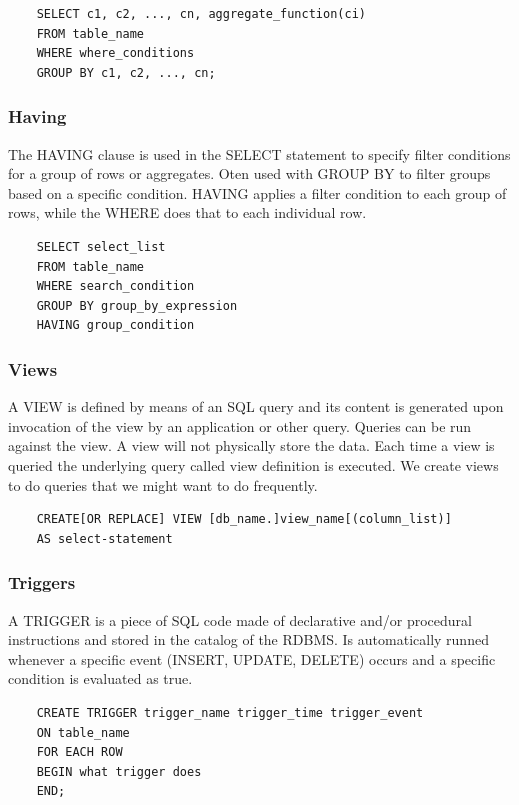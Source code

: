 \begin{verbatim}
    SELECT c1, c2, ..., cn, aggregate_function(ci)
    FROM table_name
    WHERE where_conditions
    GROUP BY c1, c2, ..., cn;
\end{verbatim}

\subsubsection{Having}

The HAVING clause is used in the SELECT statement to specify filter conditions for a group of rows or aggregates. Oten used with GROUP BY to filter groups based on a specific condition. HAVING applies a filter condition to each group of rows, while the WHERE does that to each individual row.

\begin{verbatim}
    SELECT select_list
    FROM table_name
    WHERE search_condition
    GROUP BY group_by_expression
    HAVING group_condition
\end{verbatim}

\subsubsection{Views}

A VIEW is defined by means of an SQL query and its content is generated upon invocation of the view by an application or other query. Queries can be run against the view. A view will not physically store the data. Each time a view is queried the underlying query called view definition is executed. We create views to do queries that we might want to do frequently.

\begin{verbatim}
    CREATE[OR REPLACE] VIEW [db_name.]view_name[(column_list)]
    AS select-statement
\end{verbatim}

\subsubsection{Triggers}

A TRIGGER is a piece of SQL code made of declarative and/or procedural instructions and stored in the catalog of the RDBMS. Is automatically runned whenever a specific event (INSERT, UPDATE, DELETE) occurs and a specific condition is evaluated as true.

\begin{verbatim}
    CREATE TRIGGER trigger_name trigger_time trigger_event
    ON table_name
    FOR EACH ROW
    BEGIN what trigger does
    END;
\end{verbatim}

